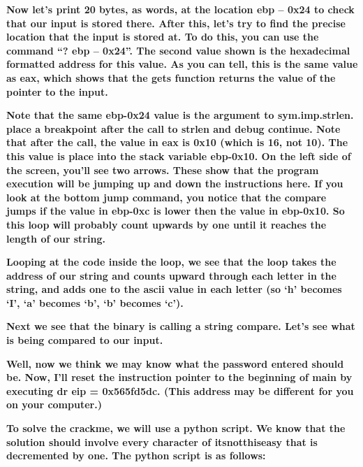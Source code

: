 \documentclass[letterpaper]{article}
\newcommand{\sitfig}[3]{
\begin{figure}[H]
\centering
\makebox[\textwidth][c]{
#2
}
\label{#1}
\end{figure}
}
\newcommand{\sitgfx}[4][scale=1.0]{
\sitfig{#3}{\texttt{[image: \#2]}}{#4}
}
\begin{document}
\textbf{Now let's print 20 bytes, as words, at the location ebp -- 0x24 to check that our input is stored there. After
this, let's try to find the precise location that the input is stored at. To do this, you can use the command ``? ebp
-- 0x24''. The second value shown is the hexadecimal formatted address for this value. As you can tell, this is the
same value as eax, which shows that the gets function returns the value of the pointer to the input.}

  
\sitgfx[width=6.5in,height=4.0626in]{FINALWORKINGDOCFORMERLYPRECURSOR-img061.png}{fig:unk}{TODO CAPTION}
 

\textbf{Note that the same ebp-0x24 value is the argument to sym.imp.strlen. place a breakpoint after the call to strlen
and debug continue. Note that after the call, the value in eax is 0x10 (which is 16, not 10). The this value is place
into the stack variable ebp-0x10. On the left side of the screen, you'll see two arrows. These show that the program
execution will be jumping up and down the instructions here. If you look at the bottom jump command, you notice that
the compare jumps if the value in ebp-0xc is lower then the value in ebp-0x10. So this loop will probably count upwards
by one until it reaches the length of our string.}

  
\sitgfx[width=6.5in,height=4.0626in]{FINALWORKINGDOCFORMERLYPRECURSOR-img062.png}{fig:unk}{TODO CAPTION}
 

\textbf{Looping at the code inside the loop, we see that the loop takes the address of our string and counts upward
through each letter in the string, and adds one to the ascii value in each letter (so `h' becomes `I', `a' becomes `b',
`b' becomes `c').}

  
\sitgfx[width=6.5in,height=4.0626in]{FINALWORKINGDOCFORMERLYPRECURSOR-img063.png}{fig:unk}{TODO CAPTION}
 

\textbf{Next we see that the binary is calling a string compare. Let's see what is being compared to our input.}

  
\sitgfx[width=6.5in,height=4.0626in]{FINALWORKINGDOCFORMERLYPRECURSOR-img064.png}{fig:unk}{TODO CAPTION}
 

\textbf{Well, now we think we may know what the password entered should be. Now, I'll reset the instruction pointer to
the beginning of main by executing dr eip = 0x565fd5dc. (This address may be different for you on your computer.)}

\textbf{To solve the crackme, we will use a python script. We know that the solution should involve every character of
itsnotthiseasy that is decremented by one. The python script is as follows:}
\end{document}
